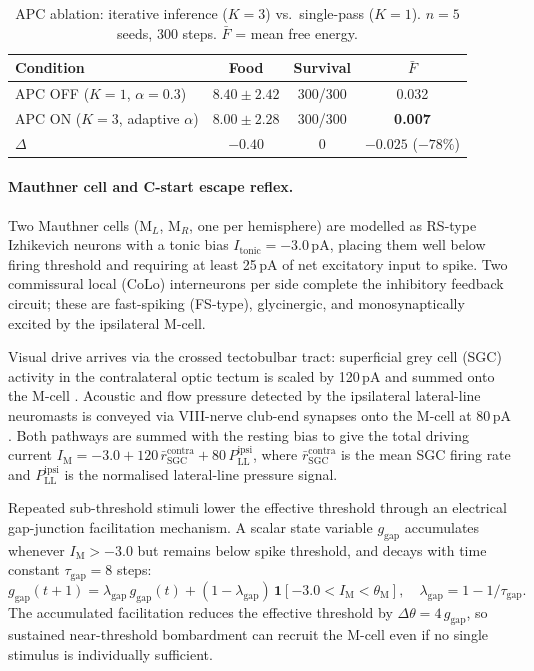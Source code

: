 \documentclass[12pt]{article}
\begin{document}
\begin{table}[H]
\centering
\caption{APC ablation: iterative inference ($K\!=\!3$) vs.\ single-pass
  ($K\!=\!1$). $n\!=\!5$ seeds, 300 steps. $\bar{F}$ = mean free energy.}
\label{tab:apc_ablation}
\begin{tabular}{lccc}
\toprule
Condition & Food & Survival & $\bar{F}$ \\
\midrule
APC OFF ($K\!=\!1$, $\alpha\!=\!0.3$) & $8.40 \pm 2.42$ & 300/300 & 0.032 \\
APC ON  ($K\!=\!3$, adaptive $\alpha$) & $8.00 \pm 2.28$ & 300/300 & \textbf{0.007} \\
\midrule
$\Delta$ & $-0.40$ & $0$ & $-0.025$ ($-78\%$) \\
\bottomrule
\end{tabular}
\end{table}

\paragraph{Mauthner cell and C-start escape reflex.}

Two Mauthner cells ($\text{M}_L$, $\text{M}_R$, one per hemisphere) are modelled
as RS-type Izhikevich neurons with a tonic bias $I_\text{tonic} = -3.0$\,pA,
placing them well below firing threshold and requiring at least 25\,pA of net
excitatory input to spike.  Two commissural local (CoLo) interneurons per side
complete the inhibitory feedback circuit; these are fast-spiking (FS-type),
glycinergic, and monosynaptically excited by the ipsilateral M-cell.

Visual drive arrives via the crossed tectobulbar tract: superficial grey cell
(SGC) activity in the contralateral optic tectum is scaled by 120\,pA and
summed onto the M-cell \citep{delbene2010}.  Acoustic and flow pressure
detected by the ipsilateral lateral-line neuromasts is conveyed via VIII-nerve
club-end synapses onto the M-cell at 80\,pA \citep{pereda2011}.  Both pathways
are summed with the resting bias to give the total driving current
$I_\text{M} = -3.0 + 120\,\bar{r}_\text{SGC}^\text{contra} +
80\,P_\text{LL}^\text{ipsi}$, where $\bar{r}_\text{SGC}^\text{contra}$ is the
mean SGC firing rate and $P_\text{LL}^\text{ipsi}$ is the normalised
lateral-line pressure signal.

Repeated sub-threshold stimuli lower the effective threshold through an
electrical gap-junction facilitation mechanism.  A scalar state variable
$g_\text{gap}$ accumulates whenever $I_\text{M} > -3.0$ but remains below
spike threshold, and decays with time constant $\tau_\text{gap} = 8$ steps:
\begin{equation}\label{eq:gap}
  g_\text{gap}(t{+}1) = \lambda_\text{gap}\,g_\text{gap}(t)
    + (1 - \lambda_\text{gap})\,
      \mathbf{1}[{-3.0 < I_\text{M} < \theta_\text{M}}],
  \quad \lambda_\text{gap} = 1 - 1/\tau_\text{gap}.
\end{equation}
The accumulated facilitation reduces the effective threshold by
$\Delta\theta = 4\,g_\text{gap}$, so sustained near-threshold bombardment
can recruit the M-cell even if no single stimulus is individually sufficient.
\end{document}
